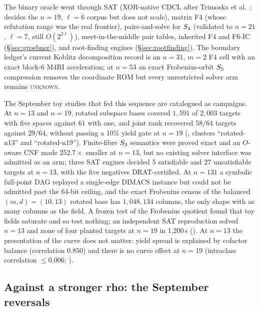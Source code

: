 The binary oracle went through SAT (XOR-native CDCL after Trimoska et
al.~\cite{trimoska2020}; decides the $n=19$, $\ell=6$ corpus but does not
scale), matrix F4 (whose refutation range was the real frontier),
pairs-and-solve for $S_{4}$ (validated to $n=21$, $\ell=7$, still
$O(2^{2\ell})$), meet-in-the-middle pair tables, inherited F4 and F6-IC
(\S\ref{sec:groebner}), and root-finding engines (\S\ref{sec:rootfinding}).
The boundary ledger's current Koblitz decomposition record is an $n=31$,
$m=2$ F4 cell with an exact block-6 M4RI acceleration; at $n=53$ an exact
Frobenius-orbit $S_{5}$ compression removes the coordinate ROM but every
unrestricted solver arm remains \textsc{unknown}.

The September toy studies that fed this sequence are catalogued as
campaigns. At $n=13$ and $n=19$, rotated subspace bases covered $1{,}591$ of
$2{,}003$ targets with five spaces against $61$ with one, and joint rank
recovered $58/64$ targets against $29/64$, without passing a 10\% yield
gate at $n=19$ (, clusters
``rotated-n13'' and ``rotated-n19''). Finite-fibre $S_{3}$ semantics were
proved exact and an $O$-aware CNF made $252.7\times$ smaller at $n=13$, but
no existing solver interface was admitted as an arm; three SAT engines
decided 5 satisfiable and 27 unsatisfiable targets at $n=13$, with the five
negatives DRAT-certified. At $n=131$ a symbolic full-point DAG replayed a
single-edge DIMACS instance but could not be admitted past the 64-bit
ceiling, and the exact Frobenius census of the balanced $(m,d)=(10,13)$
rotated base has $1{,}048{,}134$ columns, the only shape with as many columns
as the field. A frozen test of the Frobenius quotient found that toy fields
saturate and so test nothing; an independent SAT reproduction solved
$n=13$ and none of four planted targets at $n=19$ in 1{,}200\,s
(). At $n=13$ the
presentation of the curve does not matter: yield spread is explained by
cofactor balance (correlation $0.850$) and there is no curve effect at
$n=19$ (intraclass correlation $\le0.006$;
).

\subsection{Against a stronger rho: the September reversals}\label{sec:koblitz-strong}

